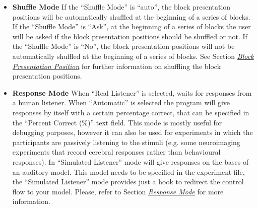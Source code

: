 \documentclass[a4paper,12pt,english]{sphinxmanual}
\begin{document}
\begin{itemize}
\item {} 
\textbf{Shuffle Mode} If the “Shuffle Mode” is “auto”, the block
presentation positions will be automatically shuffled at the
beginning of a series of blocks. If the “Shuffle Mode” is “Ask”, at
the beginning of a series of blocks the user will be asked if the
block presentation positions should be shuffled or not. If the
“Shuffle Mode” is “No”, the block presentation positions will not be
automatically shuffled at the beginning of a series of blocks. See
Section {\hyperref[engine:sec-shuffling]{\emph{Block Presentation Position}}} for further information on shuffling the
block presentation positions.

\item {} 
\textbf{Response Mode} When “Real Listener” is selected,
 waits for responses from a human listener. When
“Automatic” is selected the program will give responses by itself
with a certain percentage correct, that can be specified in the
“Percent Correct (\%)” text field. This mode is mostly useful for
debugging purposes, however it can also be used for experiments in
which the participants are passively listening to the stimuli (e.g.
some neuroimaging experiments that record cerebral responses rather
than behavioural responses). In “Simulated Listener” mode
 will give responses on the bases of an auditory
model. This model needs to be specified in the experiment file, the
“Simulated Listener” mode provides just a hook to redirect the
control flow to your model. Please, refer to
Section {\hyperref[engine:sec-response-mode]{\emph{Response Mode}}} for more information.

\end{itemize}
\end{document}
